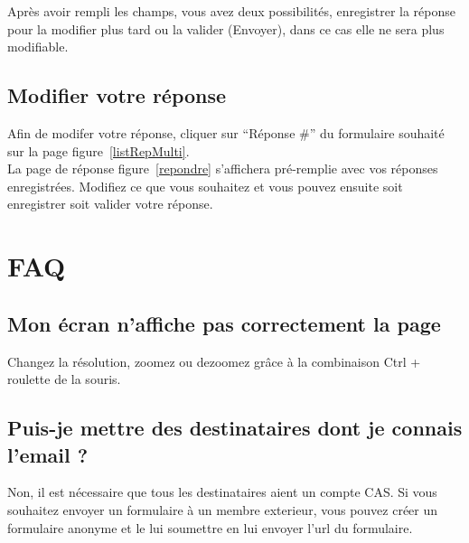 \documentclass[a4paper,11pt,final]{report}
\begin{document}
\noindent\begin{minipage}{\linewidth}%
\label{repondre}
\end{minipage}

Après avoir rempli les champs, vous avez deux possibilités, enregistrer la réponse pour la modifier plus tard ou la valider (Envoyer), dans ce cas elle ne sera plus modifiable.

\section{Modifier votre réponse}
Afin de modifer votre réponse, cliquer sur ``Réponse \#'' du formulaire souhaité sur la page figure~\ref{listRepMulti}.\\
La page de réponse figure~\ref{repondre} s'affichera pré-remplie avec vos réponses enregistrées. Modifiez ce que vous souhaitez et vous pouvez ensuite soit enregistrer soit valider votre réponse.



\chapter{FAQ}
\section{Mon écran n'affiche pas correctement la page}
Changez la résolution, zoomez ou dezoomez grâce à la combinaison Ctrl + roulette de la souris.
\section{Puis-je mettre des destinataires dont je connais l'email ?}
Non, il est nécessaire que tous les destinataires aient un compte CAS. Si vous souhaitez envoyer un formulaire à un membre exterieur, vous pouvez créer un formulaire anonyme et le lui soumettre en lui envoyer l'url du formulaire.
\end{document}
